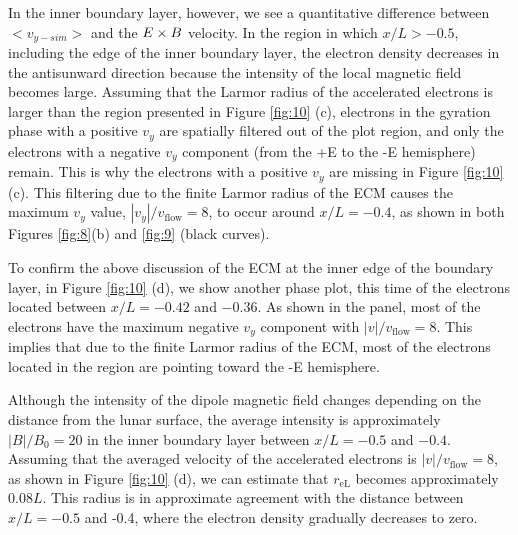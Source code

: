 \documentclass[draft,jgrga]{agutex2015}
\begin{document}
\begin{article}


In the inner boundary layer, however, 
we see a quantitative difference between 
$<v_{y-sim}>$ and 
the $\mbox{\boldmath $E$} \times \mbox{\boldmath $B$}$ velocity.
In the region in which $x/L > -0.5$, including the edge of the inner boundary layer, 
the electron density decreases in the antisunward direction 
because the intensity of the local magnetic field becomes large.
Assuming that the Larmor radius of the accelerated electrons
is larger than the region presented in Figure \ref{fig:10} (c), 
electrons in the gyration phase with a positive $v_y$ are 
spatially filtered out of the plot region,
and only the electrons with a negative $v_y$ component
(from the +E to the -E hemisphere) remain.
This is why the electrons with a positive $v_y$ 
are missing in Figure \ref{fig:10} (c).
This filtering due to the finite Larmor radius of the ECM 
causes the maximum $v_y$ value, $|v_y|/v_\mathrm{flow}=8$, to occur  
around $x/L = -0.4$, as
shown in both Figures \ref{fig:8}(b) and \ref{fig:9} (black curves). 

To confirm the above discussion of the ECM 
at the inner edge of the boundary layer, in Figure \ref{fig:10} (d),
we show another phase plot, this time of the electrons located between 
$x/L = -0.42$ and $-0.36$.
As shown in the panel, 
most of the electrons have the maximum negative $v_y$ component 
with $|v|/v_\mathrm{flow}=8$. 
This implies that 
due to the finite Larmor radius of the ECM, 
most of the electrons located in the region 
are pointing toward
the -E hemisphere. 

Although the intensity of the dipole magnetic field changes depending on 
the distance from the lunar surface, 
the average intensity is approximately $|B|/B_{\mathrm{0}}=20$ 
in the inner boundary layer between $x/L = -0.5$ and $-0.4$.
Assuming that the averaged velocity of the accelerated electrons is 
$|v|/v_\mathrm{flow}=8$, as shown in Figure \ref{fig:10} (d),
we can estimate that $r_\mathrm{eL}$ becomes approximately $0.08L$.
This radius is in approximate agreement with the distance 
between $x/L = -0.5$ and -0.4, where
the electron density gradually decreases to zero.


\end{article}
\end{document}
